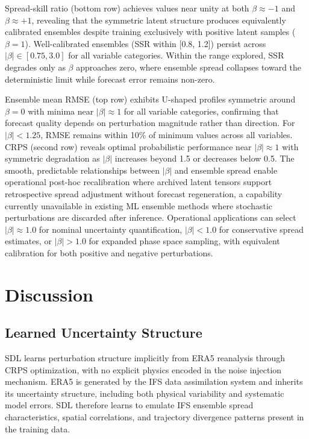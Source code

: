 \documentclass{agujournal2019}
\begin{document}
Spread-skill ratio (bottom row) achieves values near unity at both $\beta \approx -1$ and $\beta \approx +1$, revealing that the symmetric latent structure produces equivalently calibrated ensembles despite training exclusively with positive latent samples ($\beta = 1$). Well-calibrated ensembles (SSR within [0.8, 1.2]) persist across $|\beta| \in [0.75, 3.0]$ for all variable categories. Within the range explored, SSR degrades only as $\beta$ approaches zero, where ensemble spread collapses toward the deterministic limit while forecast error remains non-zero.

Ensemble mean RMSE (top row) exhibits U-shaped profiles symmetric around $\beta = 0$ with minima near $|\beta| \approx 1$ for all variable categories, confirming that forecast quality depends on perturbation magnitude rather than direction. For $|\beta| < 1.25$, RMSE remains within 10\% of minimum values across all variables. CRPS (second row) reveals optimal probabilistic performance near $|\beta| \approx 1$ with symmetric degradation as $|\beta|$ increases beyond 1.5 or decreases below 0.5. The smooth, predictable relationships between $|\beta|$ and ensemble spread enable operational post-hoc recalibration where archived latent tensors support retrospective spread adjustment without forecast regeneration, a capability currently unavailable in existing ML ensemble methods where stochastic perturbations are discarded after inference. Operational applications can select $|\beta| \approx 1.0$ for nominal uncertainty quantification, $|\beta| < 1.0$ for conservative spread estimates, or $|\beta| > 1.0$ for expanded phase space sampling, with equivalent calibration for both positive and negative perturbations.

\section{Discussion}

\subsection{Learned Uncertainty Structure}

SDL learns perturbation structure implicitly from ERA5 reanalysis through CRPS optimization, with no explicit physics encoded in the noise injection mechanism. ERA5 is generated by the IFS data assimilation system and inherits its uncertainty structure, including both physical variability and systematic model errors. SDL therefore learns to emulate IFS ensemble spread characteristics, spatial correlations, and trajectory divergence patterns present in the training data.
\end{document}
